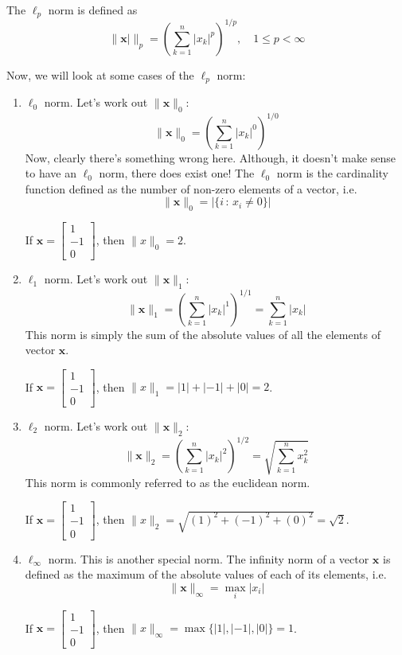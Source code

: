 \documentclass[12pt]{article}
\begin{document}
\begin{definition}
The $\ell_p$ norm is defined as $$\|\mathbf{x}|\|_p = \left(\sum_{k=1}^n |x_k|^p\right)^{1/p},\quad 1\leqslant p<\infty$$
\end{definition}
\noindent Now, we will look at some cases of the $\ell_p$ norm:
\begin{enumerate}
\item $\ell_0$ norm. Let's work out $\|\mathbf{x}\|_0$: $$\|\mathbf{x}\|_0 = \left(\sum_{k=1}^n |x_k|^0\right)^{1/0}$$ Now, clearly there's something wrong here. Although, it doesn't make sense to have an $\ell_0$ norm, there does exist one! The $\ell_0$ norm is the cardinality function defined as the number of non-zero elements of a vector, i.e. $$\|\mathbf{x}\|_0 =  |\{i\,:\, x_i \neq 0\}|$$
\begin{example}
If $\mathbf{x} = \begin{bmatrix}1 \\ -1 \\ 0\end{bmatrix}$, then $\|x\|_0 = 2$.
\end{example}
\item $\ell_1$ norm. Let's work out $\|\mathbf{x}\|_1$: $$\|\mathbf{x}\|_1 = \left(\sum_{k=1}^n |x_k|^1\right)^{1/1} = \sum_{k=1}^n |x_k|$$
This norm is simply the sum of the absolute values of all the elements of vector $\mathbf{x}$. 
\begin{example}
If $\mathbf{x} = \begin{bmatrix}1 \\ -1 \\ 0\end{bmatrix}$, then $\|x\|_1 = |1| + |-1| + |0| = 2$.
\end{example}
\item $\ell_2$ norm. Let's work out $\|\mathbf{x}\|_2$: $$\|\mathbf{x}\|_2 = \left(\sum_{k=1}^n |x_k|^2\right)^{1/2} = \sqrt{\sum_{k=1}^n x_k^2}$$
This norm is commonly referred to as the euclidean norm. 
\begin{example}
If $\mathbf{x} = \begin{bmatrix}1 \\ -1 \\ 0\end{bmatrix}$, then $\|x\|_2 = \sqrt{(1)^2 + (-1)^2 + (0)^2} = \sqrt{2}$.
\end{example}

\item $\ell_\infty$ norm. This is another special norm. The infinity norm of a vector $\mathbf{x}$ is defined as the maximum of the absolute values of each of its elements, i.e. $$\|\mathbf{x}\|_\infty = \max_i |x_i|$$
\begin{example}
If $\mathbf{x} = \begin{bmatrix}1 \\ -1 \\ 0\end{bmatrix}$, then $\|x\|_\infty = \max\{|1|,|-1|,|0|\} = 1$.
\end{example}
\end{enumerate}
\end{document}

